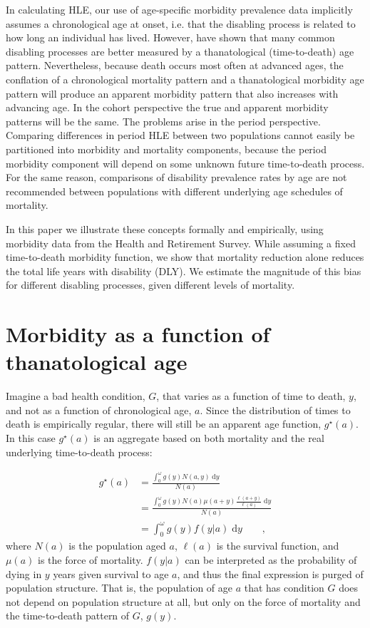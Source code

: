 \documentclass[11pt,oneside,a4paper]{article} %
\newcommand{\dd}{\; \mathrm{d}}
\newcommand{\tc}{\quad\quad\text{,}}
\begin{document}
In calculating HLE, our use of age-specific morbidity prevalence data implicitly assumes a chronological age at onset, i.e. that the disabling process is related to how long an individual has lived. However, \citet{Riffe2015} have shown that many common disabling processes are better measured by a thanatological (time-to-death) age pattern. Nevertheless, because death occurs most often at advanced ages, the conflation of a chronological mortality pattern and a thanatological morbidity age pattern will produce an apparent morbidity pattern that also increases with advancing age. In the cohort perspective the true and apparent morbidity patterns will be the same. The problems arise in the period perspective. Comparing differences in period HLE between two populations cannot easily be partitioned into morbidity and mortality components, because the period morbidity component will depend on some unknown future time-to-death process. For the same reason, comparisons of disability prevalence rates by age are not recommended between populations with different underlying age schedules of mortality.

 In this paper we illustrate these concepts formally and empirically, using morbidity data from the Health and Retirement Survey. While assuming a fixed time-to-death morbidity function, we show that mortality reduction alone reduces the total life years with disability (DLY). We estimate the magnitude of this bias for different disabling processes, given different levels of mortality. 


\section{Morbidity as a function of thanatological age}
 
Imagine a bad health condition, $G$, that varies as a function of time to death,
$y$, and not as a function of chronological age, $a$. Since the distribution of
times to death is empirically regular, there will still be an apparent age
function, $g^\star(a)$.
In this case $g^\star(a)$ is an aggregate based on both mortality and the real underlying time-to-death process:
 
\begin{align}
g^\star(a) &= \frac{\int _0^\omega g(y) N(a,y) \dd y}{N(a)} \\
      &= \frac{\int _0^\omega g(y) N(a)
      \mu(a+y)\frac{\ell(a+y)}{\ell(a)}\dd y}{N(a)}\\
      &= \int _0^\omega g(y) f(y|a)\dd y \tc
\end{align}
where $N(a)$ is the population aged $a$, $\ell(a)$ is the survival function, and
$\mu(a)$ is the force of mortality. $f(y|a)$ can be interpreted as the
probability of dying in $y$ years given survival to age $a$, and thus the final
expression is purged of population structure. That is, the population of age $a$
that has condition $G$ does not depend on population structure at all, but only
on the force of mortality and the time-to-death pattern of $G$, $g(y)$. 
\end{document}
